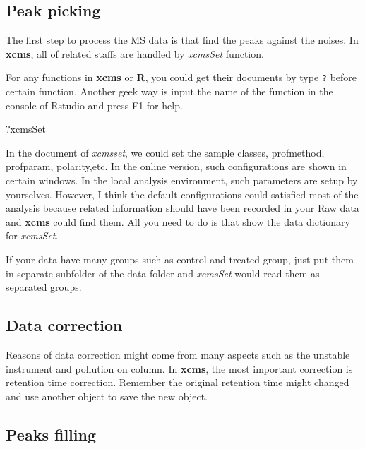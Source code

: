 \documentclass[
]{book}
\newenvironment{Shaded}{\begin{snugshade}}{\end{snugshade}}
\newcommand{\NormalTok}[1]{#1}
\begin{document}
\hypertarget{peak-picking-1}{%
\subsection{Peak picking}\label{peak-picking-1}}

The first step to process the MS data is that find the peaks against the noises. In \textbf{xcms}, all of related staffs are handled by \emph{xcmsSet} function.

For any functions in \textbf{xcms} or \textbf{R}, you could get their documents by type \texttt{?} before certain function. Another geek way is input the name of the function in the console of Rstudio and press F1 for help.

\begin{Shaded}
\begin{Highlighting}[]
\NormalTok{?xcmsSet}
\end{Highlighting}
\end{Shaded}

In the document of \emph{xcmsset}, we could set the sample classes, profmethod, profparam, polarity,etc. In the online version, such configurations are shown in certain windows. In the local analysis environment, such parameters are setup by yourselves. However, I think the default configurations could satisfied most of the analysis because related information should have been recorded in your Raw data and \textbf{xcms} could find them. All you need to do is that show the data dictionary for \emph{xcmsSet}.

If your data have many groups such as control and treated group, just put them in separate subfolder of the data folder and \emph{xcmsSet} would read them as separated groups.

\hypertarget{data-correction}{%
\subsection{Data correction}\label{data-correction}}

Reasons of data correction might come from many aspects such as the unstable instrument and pollution on column. In \textbf{xcms}, the most important correction is retention time correction. Remember the original retention time might changed and use another object to save the new object.

\hypertarget{peaks-filling}{%
\subsection{Peaks filling}\label{peaks-filling}}
\end{document}
